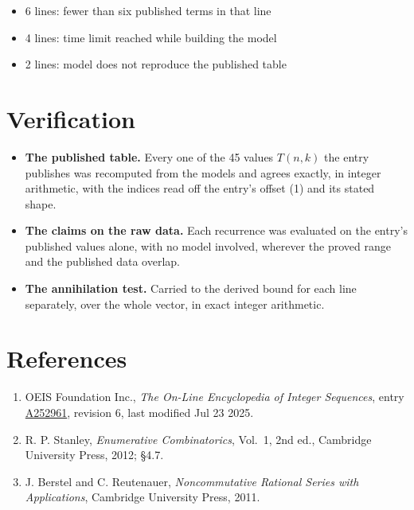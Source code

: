 \documentclass[11pt]{article}
\theoremstyle{definition}
\begin{document}
\begin{itemize}

\item 6 lines: fewer than six published terms in that line

\item 4 lines: time limit reached while building the model

\item 2 lines: model does not reproduce the published table

\end{itemize}

\section{Verification}

\begin{itemize}

\item {\bfseries The published table.} Every one of the 45 values $T(n,k)$ the entry publishes was recomputed from the models and agrees exactly, in integer arithmetic, with the indices read off the entry's offset (1) and its stated shape.

\item {\bfseries The claims on the raw data.} Each recurrence was evaluated on the entry's published values alone, with no model involved, wherever the proved range and the published data overlap.

\item {\bfseries The annihilation test.} Carried to the derived bound for each line separately, over the whole vector, in exact integer arithmetic.

\end{itemize}

\section{References}

\begin{enumerate}

\item OEIS Foundation Inc., \emph{The On-Line Encyclopedia of Integer Sequences}, entry \href{https://oeis.org/A252961}{A252961}, revision 6, last modified Jul 23 2025.

\item R. P. Stanley, \emph{Enumerative Combinatorics}, Vol.~1, 2nd ed., Cambridge University Press, 2012; \S4.7.

\item J. Berstel and C. Reutenauer, \emph{Noncommutative Rational Series with Applications}, Cambridge University Press, 2011.

\end{enumerate}
\end{document}
